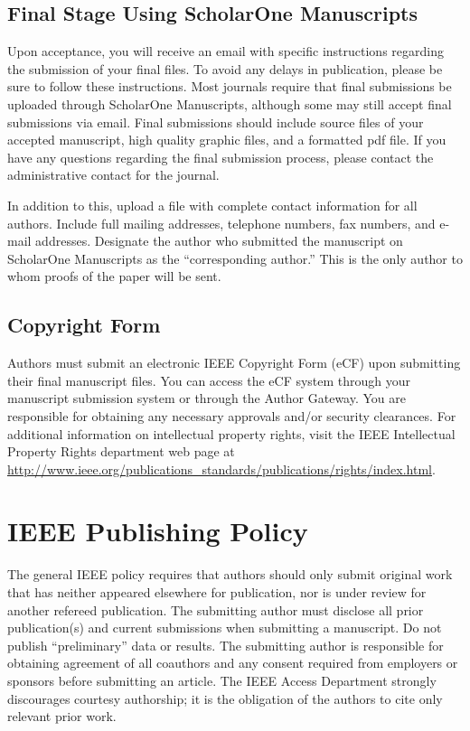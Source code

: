 \documentclass{ieeeaccess}
\begin{document}
\subsection{Final Stage Using ScholarOne Manuscripts}
Upon acceptance, you will receive an email with specific instructions 
regarding the submission of your final files. To avoid any delays in 
publication, please be sure to follow these instructions. Most journals 
require that final submissions be uploaded through ScholarOne Manuscripts, 
although some may still accept final submissions via email. Final 
submissions should include source files of your accepted manuscript, high 
quality graphic files, and a formatted pdf file. If you have any questions 
regarding the final submission process, please contact the administrative 
contact for the journal. 

In addition to this, upload a file with complete contact information for all 
authors. Include full mailing addresses, telephone numbers, fax numbers, and 
e-mail addresses. Designate the author who submitted the manuscript on 
ScholarOne Manuscripts as the ``corresponding author.'' This is the only 
author to whom proofs of the paper will be sent. 

\subsection{Copyright Form}
Authors must submit an electronic IEEE Copyright Form (eCF) upon submitting 
their final manuscript files. You can access the eCF system through your 
manuscript submission system or through the Author Gateway. You are 
responsible for obtaining any necessary approvals and/or security 
clearances. For additional information on intellectual property rights, 
visit the IEEE Intellectual Property Rights department web page at 
\underline{http://www.ieee.org/publications\_standards/publications/}\break\underline{rights/index.html}. 

\section{IEEE Publishing Policy}
The general IEEE policy requires that authors should only submit original 
work that has neither appeared elsewhere for publication, nor is under 
review for another refereed publication. The submitting author must disclose 
all prior publication(s) and current submissions when submitting a 
manuscript. Do not publish ``preliminary'' data or results. The submitting 
author is responsible for obtaining agreement of all coauthors and any 
consent required from employers or sponsors before submitting an article. 
The IEEE Access Department strongly discourages courtesy 
authorship; it is the obligation of the authors to cite only relevant prior 
work.
\end{document}
